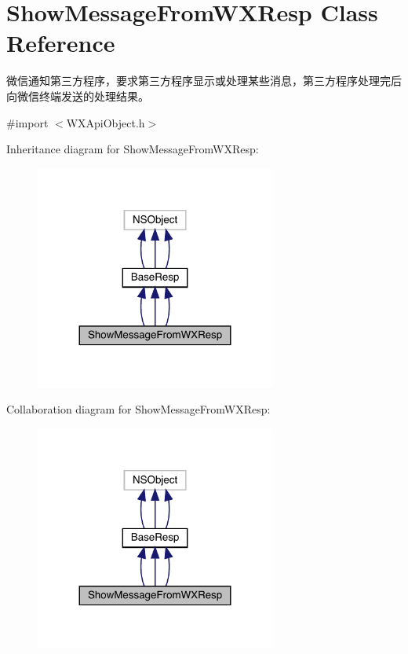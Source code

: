 \hypertarget{interface_show_message_from_w_x_resp}{}\section{Show\+Message\+From\+W\+X\+Resp Class Reference}
\label{interface_show_message_from_w_x_resp}


微信通知第三方程序，要求第三方程序显示或处理某些消息，第三方程序处理完后向微信终端发送的处理结果。  




{\ttfamily \#import $<$W\+X\+Api\+Object.\+h$>$}



Inheritance diagram for Show\+Message\+From\+W\+X\+Resp\+:\nopagebreak
\begin{figure}[H]
\begin{center}
\leavevmode
\includegraphics[width=224pt]{interface_show_message_from_w_x_resp__inherit__graph}
\end{center}
\end{figure}


Collaboration diagram for Show\+Message\+From\+W\+X\+Resp\+:\nopagebreak
\begin{figure}[H]
\begin{center}
\leavevmode
\includegraphics[width=224pt]{interface_show_message_from_w_x_resp__coll__graph}
\end{center}
\end{figure}
